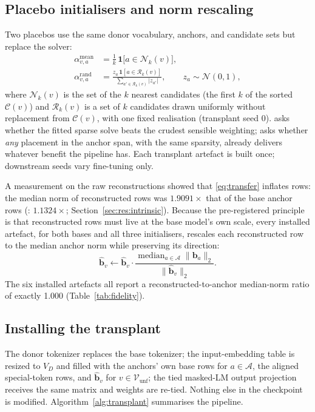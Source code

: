 \subsection{Placebo initialisers and norm rescaling}
\label{sec:method:placebo}
Two placebos use the same donor vocabulary, anchors, and candidate sets but replace the solver:
\begin{align}
\alpha^{\mathrm{mean}}_{v,a}&=\tfrac{1}{k}\,\mathbf{1}\big[a\in\mathcal{N}_k(v)\big], \label{eq:mean}\\
\alpha^{\mathrm{rand}}_{v,a}&=\frac{z_a\,\mathbf{1}[a\in\mathcal{R}_k(v)]}{\sum_{a'\in\mathcal{R}_k(v)}|z_{a'}|},\qquad z_a\sim\mathcal{N}(0,1), \label{eq:random}
\end{align}
where $\mathcal{N}_k(v)$ is the set of the $k$ nearest candidates (the first $k$ of the sorted $\mathcal{C}(v)$) and $\mathcal{R}_k(v)$ is a set of $k$ candidates drawn uniformly without replacement from $\mathcal{C}(v)$, with one fixed realisation (transplant seed 0). \Mean{} asks whether the fitted sparse solve beats the crudest sensible weighting; \Random{} asks whether \emph{any} placement in the anchor span, with the same sparsity, already delivers whatever benefit the pipeline has. Each transplant artefact is built once; downstream seeds vary fine-tuning only.

A measurement on the raw reconstructions showed that \eqref{eq:transfer} inflates \xlmr{} rows: the median norm of reconstructed rows was $1.9091\times$ that of the base anchor rows (\xlmxv: $1.1324\times$; Section~\ref{sec:res:intrinsic}). Because the pre-registered principle is that reconstructed rows must live at the base model's own scale, every installed artefact, for both bases and all three initialisers, rescales each reconstructed row to the median anchor norm while preserving its direction:
\begin{equation}
\hat{\mathbf{b}}_v\leftarrow\hat{\mathbf{b}}_v\cdot\frac{\operatorname{median}_{a\in\mathcal{A}}\|\mathbf{b}_a\|_2}{\|\hat{\mathbf{b}}_v\|_2}.
\label{eq:rescale}
\end{equation}
The six installed artefacts all report a reconstructed-to-anchor median-norm ratio of exactly 1.000 (Table~\ref{tab:fidelity}).

\subsection{Installing the transplant}
The donor tokenizer replaces the base tokenizer; the input-embedding table is resized to $V_D$ and filled with the anchors' own base rows for $a\in\mathcal{A}$, the aligned special-token rows, and $\hat{\mathbf{b}}_v$ for $v\in\mathcal{V}_{\mathrm{unf}}$; the tied masked-LM output projection receives the same matrix and weights are re-tied. Nothing else in the checkpoint is modified. Algorithm~\ref{alg:transplant} summarises the pipeline.

